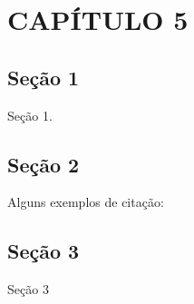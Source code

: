 \chapter{CAPÍTULO 5}
\label{sec:cap5}

 \section{Seção 1}
	
		Seção 1.
	
	\section{Seção 2}
	
		Alguns exemplos de citação:

			
	\section{Seção 3}
	
		Seção 3